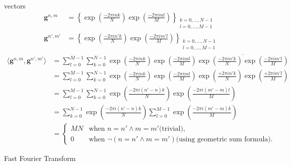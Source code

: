 \begin{Proof} vectors
    \begin{align} 
        \boldsymbol{g}^{n,m}    &= \left\{\exp\left({\frac{-2\pi ink}{N}}\right)\exp\left({\frac{-2\pi iml}{M}}\right)\right\}_{\substack{k=0,\ldots,N-1\\l=0,\ldots,M-1}}\\
        \boldsymbol{g}^{n',m'}  &= \left\{\exp\left({\frac{-2\pi in'k}{N}}\right)\exp\left({\frac{-2\pi im'l}{M}}\right)\right\}_{\substack{k=0,\ldots,N-1\\l=0,\ldots,M-1}}
    \end{align}
    \begin{equation}
        \begin{split}  
            \langle\boldsymbol{g}^{n,m},\boldsymbol{g}^{n',m'}\rangle &= \sum_{l=0}^{M-1}\sum_{k=0}^{N-1} \exp\left({\frac{-2\pi ink}{N}}\right)\exp\left({\frac{-2\pi iml}{M}}\right)\overline{\exp\left({\frac{-2\pi in'k}{N}}\right)\exp\left({\frac{-2\pi im'l}{M}}\right)}\\
            &= \sum_{l=0}^{M-1}\sum_{k=0}^{N-1} \exp\left({\frac{-2\pi ink}{N}}\right)\exp\left({\frac{-2\pi iml}{M}}\right)\exp\left({\frac{+2\pi in'k}{N}}\right)\exp\left({\frac{+2\pi im'l}{M}}\right)\\
            &= \sum_{l=0}^{M-1}\sum_{k=0}^{N-1} \exp\left({\frac{-2\pi i(n'-n)k}{N}}\right)\exp\left({\frac{-2\pi i(m'-m)l}{M}}\right)\\
            &= \sum_{k=0}^{N-1} \exp\left({\frac{-2\pi i(n'-n)k}{N}}\right)\sum_{l=0}^{M-1} \exp\left({\frac{-2\pi i(m'-m)k}{M}}\right)\\
            &= 
            \begin{cases}
                MN & \text{when $n = n' \wedge m=m'$}\text{(trivial)},\\
                0 & \text{when $\neg(n = n' \wedge m=m')$}\text{(using geometric sum formula)}.
            \end{cases}    
        \end{split}
    \end{equation}
\end{Proof}


\begin{Rem}
Fast Fourier Transform \cite{Cooley1965} \cite{Good1960} \cite{Frazier1999} \cite{Cormen2022}
\end{Rem}





























